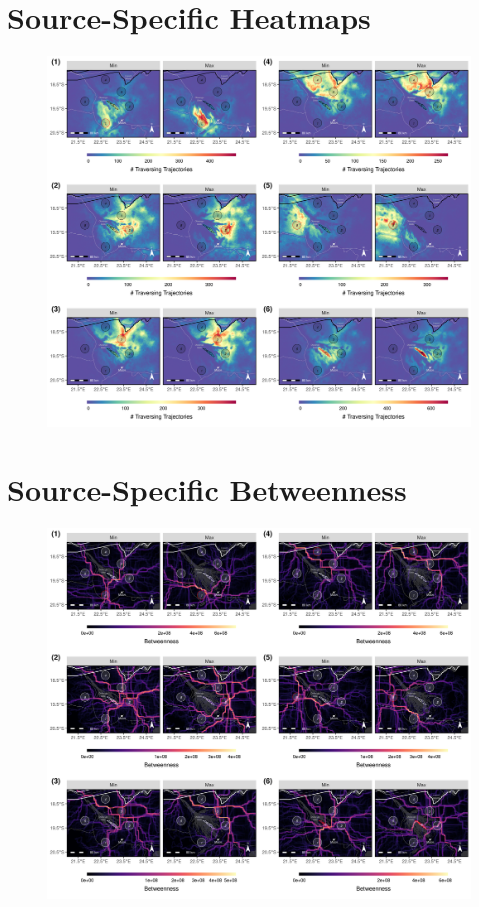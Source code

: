 \documentclass[abstract=on,10pt,a4paper,bibliography=totocnumbered]{article}
\begin{document}
\section{Source-Specific Heatmaps}
\begin{figure}[htbp]
  \begin{center}
  \includegraphics[width = \textwidth]{99_HeatmapsIndividual.png}
  \caption{}
  \label{Heatmaps}
  \end{center}
\end{figure}

\newpage
\section{Source-Specific Betweenness}
\begin{figure}[htbp]
  \begin{center}
  \includegraphics[width = \textwidth]{99_BetweennessIndividual.png}
  \caption{}
  \label{Betweenness}
  \end{center}
\end{figure}
\end{document}

